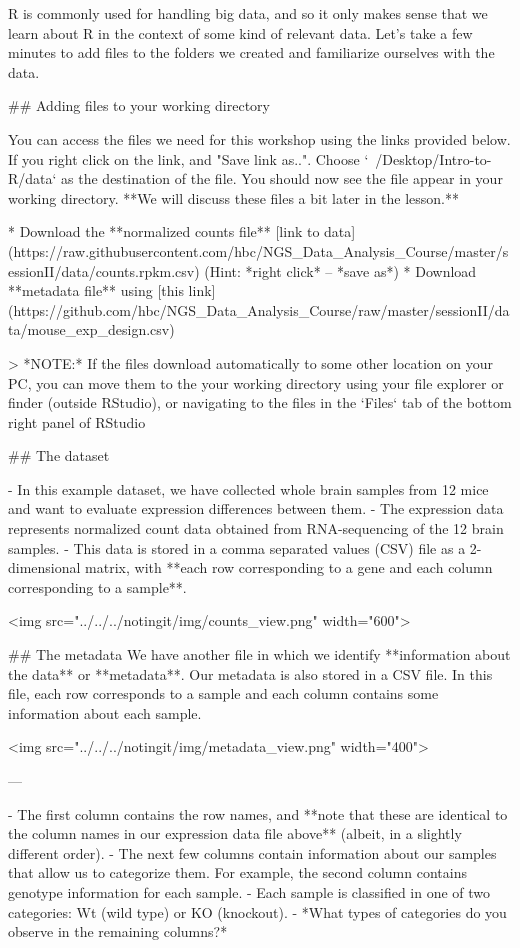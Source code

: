 R is commonly used for handling big data, and so it only makes sense that we learn about R in the context of some kind of relevant data. Let's take a few minutes to add files to the folders we created and familiarize ourselves with the data.

## Adding files to your working directory

You can access the files we need for this workshop using the links provided below. If you right click on the link, and "Save link as..". Choose `~/Desktop/Intro-to-R/data` as the destination of the file. You should now see the file appear in your working directory. **We will discuss these files a bit later in the lesson.**

* Download the **normalized counts file** [link to data](https://raw.githubusercontent.com/hbc/NGS_Data_Analysis_Course/master/sessionII/data/counts.rpkm.csv) (Hint:  *right click* -- *save as*)
* Download **metadata file** using [this link](https://github.com/hbc/NGS_Data_Analysis_Course/raw/master/sessionII/data/mouse_exp_design.csv)

> *NOTE:* If the files download automatically to some other location on your PC, you can move them to the your working directory using your file explorer or finder (outside RStudio), or navigating to the files in the `Files` tab of the bottom right panel of RStudio

## The dataset

- In this example dataset, we have collected whole brain samples from 12 mice and want to evaluate expression differences between them. 
- The expression data represents normalized count data obtained from RNA-sequencing of the 12 brain samples. 
- This data is stored in a comma separated values (CSV) file as a 2-dimensional matrix, with **each row corresponding to a gene and each column corresponding to a sample**.

<img src="../../../notingit/img/counts_view.png" width="600"> 

## The metadata
We have another file in which we identify **information about the data** or **metadata**. Our metadata is also stored in a CSV file. In this file, each row corresponds to a sample and each column contains some information about each sample. 

<img src="../../../notingit/img/metadata_view.png" width="400"> 

---

- The first column contains the row names, and **note that these are identical to the column names in our expression data file above** (albeit, in a slightly different order). 
- The next few columns contain information about our samples that allow us to categorize them. For example, the second column contains genotype information for each sample.
- Each sample is classified in one of two categories: Wt (wild type) or KO (knockout). 
- *What types of categories do you observe in the remaining columns?*

